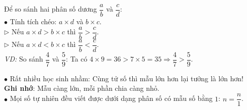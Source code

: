\documentclass[14pt,a4paper,oneside]{extbook}
\begin{document}
\noindent
\begin{minipage}[t]{0.54\textwidth}
  \begin{tcolorbox}[
    enhanced,
    title={\footnotesize\bfseries\color{white}\faBolt\ Mẹo nhân chéo so sánh siêu tốc},
    colback=green!3!white,
    colframe=green!60!black,
    arc=2.5mm, boxrule=0.8pt, top=1.8mm, bottom=1.8mm, left=2.2mm, right=2.2mm
  ]
    \footnotesize
    Để so sánh hai phân số dương $\dfrac{a}{b}$ và $\dfrac{c}{d}$:\\
    $\bullet$ Tính tích chéo: $a \times d$ và $b \times c$.\\
    $\triangleright$ Nếu $a \times d > b \times c$ thì $\dfrac{a}{b} > \dfrac{c}{d}$.\\
    $\triangleright$ Nếu $a \times d < b \times c$ thì $\dfrac{a}{b} < \dfrac{c}{d}$.\\
    \textit{VD:} So sánh $\dfrac{4}{7}$ và $\dfrac{5}{9}$: Ta có $4 \times 9 = 36 > 7 \times 5 = 35 \Rightarrow \dfrac{4}{7} > \dfrac{5}{9}$.
  \end{tcolorbox}
\end{minipage}%
\hfill
\begin{minipage}[t]{0.44\textwidth}
  \begin{tcolorbox}[
    enhanced,
    title={\footnotesize\bfseries\color{white}\faExclamationTriangle\ Mẹo tránh bẫy trắc nghiệm},
    colback=red!2!white,
    colframe=red!70!black,
    arc=2.5mm, boxrule=0.8pt, top=1.8mm, bottom=1.8mm, left=2.2mm, right=2.2mm
  ]
    \footnotesize
    $\bullet$ Rất nhiều học sinh nhầm: Cùng tử số thì mẫu lớn hơn lại tưởng là lớn hơn! \textbf{Ghi nhớ}: Mẫu càng lớn, mỗi phần chia càng nhỏ.\\
    $\bullet$ Mọi số tự nhiên đều viết được dưới dạng phân số có mẫu số bằng $1$: $n = \dfrac{n}{1}$.
  \end{tcolorbox}
\end{minipage}
\end{document}
